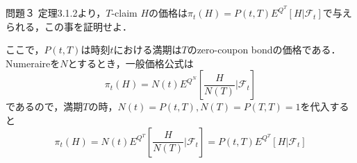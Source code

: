 \documentclass[a4paper,11pt]{jsarticle}
\numberwithin{theorem}{section}  %
\numberwithin{equation}{section} %
\begin{document}
\begin{itembox}[l]{問題３}
定理3.1.2より，$T$-claim $H$の価格は$\pi_t(H) = P(t,T)E^{Q^T}[H|\mathcal{F}_t]$で与えられる，この事を証明せよ．
\end{itembox}

ここで，$P(t,T)$は時刻$t$における満期は$T$のzero-coupon bondの価格である．Numeraireを$N$とするとき，一般価格公式は
\[
\pi_t(H) = N(t)E^{Q^N}[\frac{H}{N(T)}|\mathcal{F}_t]
\]
であるので，満期$T$の時，$N(t)=P(t,T),N(T)=P(T,T)=1$を代入すると
\[
\pi_t(H) = N(t)E^{Q^T}[\frac{H}{N(T)}|\mathcal{F}_t] = P(t,T)E^{Q^T}[H|\mathcal{F}_t]
\]
\end{document}
